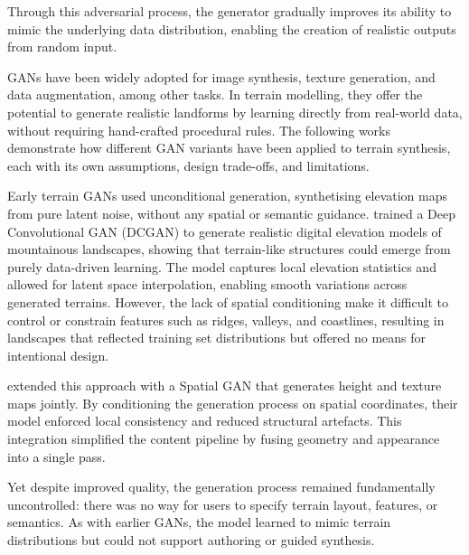 Through this adversarial process, the generator gradually improves its ability to mimic the underlying data distribution, enabling the creation of realistic outputs from random input.

GANs have been widely adopted for image synthesis, texture generation, and data augmentation, among other tasks. In terrain modelling, they offer the potential to generate realistic landforms by learning directly from real-world data, without requiring hand-crafted procedural rules. The following works demonstrate how different GAN variants have been applied to terrain synthesis, each with its own assumptions, design trade-offs, and limitations.

Early terrain GANs used unconditional generation, synthetising elevation maps from pure latent noise, without any spatial or semantic guidance. \cite{WulffJensen2018} trained a Deep Convolutional GAN (DCGAN) to generate realistic digital elevation models of mountainous landscapes, showing that terrain-like structures could emerge from purely data-driven learning. The model captures local elevation statistics and allowed for latent space interpolation, enabling smooth variations across generated terrains. However, the lack of spatial conditioning make it difficult to control or constrain features such as ridges, valleys, and coastlines, resulting in landscapes that reflected training set distributions but offered no means for intentional design.

\cite{Spick2019} extended this approach with a Spatial GAN that generates height and texture maps jointly. By conditioning the generation process on spatial coordinates, their model enforced local consistency and reduced structural artefacts. This integration simplified the content pipeline by fusing geometry and appearance into a single pass. 

Yet despite improved quality, the generation process remained fundamentally uncontrolled: there was no way for users to specify terrain layout, features, or semantics. As with earlier GANs, the model learned to mimic terrain distributions but could not support authoring or guided synthesis.

